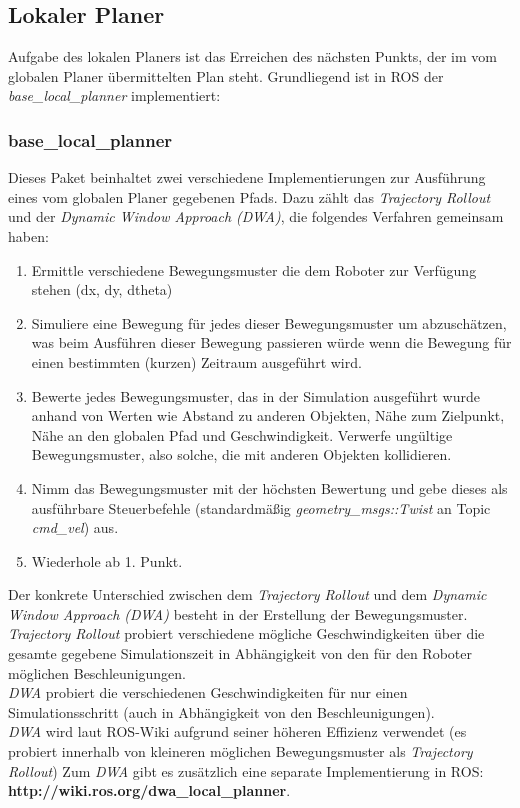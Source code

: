 \documentclass[oribibl]{llncs}
\begin{document}
\subsection{Lokaler Planer} \label{localPlanner}
Aufgabe des lokalen Planers ist das Erreichen des nächsten Punkts, der im vom globalen Planer übermittelten Plan steht. Grundliegend ist in ROS der \textit{base\_local\_planner} implementiert: \subsubsection{base\_local\_planner}
Dieses Paket beinhaltet zwei verschiedene Implementierungen zur Ausführung eines vom globalen Planer gegebenen Pfads. Dazu zählt das \textit{Trajectory Rollout} und der \textit{Dynamic Window Approach (DWA)}, die folgendes Verfahren gemeinsam haben:
\begin{enumerate}	
\item Ermittle verschiedene Bewegungsmuster die dem Roboter zur Verfügung stehen (dx, dy, dtheta)
\item Simuliere eine Bewegung für jedes dieser Bewegungsmuster um abzuschätzen, was beim Ausführen dieser Bewegung passieren würde wenn die Bewegung für einen bestimmten (kurzen) Zeitraum ausgeführt wird.
\item Bewerte jedes Bewegungsmuster, das in der Simulation ausgeführt wurde anhand von Werten wie Abstand zu anderen Objekten, Nähe zum Zielpunkt, Nähe an den globalen Pfad und Geschwindigkeit. Verwerfe ungültige Bewegungsmuster, also solche, die mit anderen Objekten kollidieren.
\item Nimm das Bewegungsmuster mit der höchsten Bewertung und gebe dieses als ausführbare Steuerbefehle (standardmäßig \textit{geometry\_msgs::Twist} an Topic \textit{cmd\_vel}) aus.
\item Wiederhole ab 1. Punkt.
\end{enumerate}

Der konkrete Unterschied zwischen dem \textit{Trajectory Rollout} und dem \textit{Dynamic Window Approach (DWA)} besteht in der Erstellung der Bewegungsmuster.\\
\textit{Trajectory Rollout} probiert verschiedene mögliche Geschwindigkeiten über die gesamte gegebene Simulationszeit in Abhängigkeit von den für den Roboter möglichen Beschleunigungen.\\
\textit{DWA} probiert die verschiedenen Geschwindigkeiten für nur einen Simulationsschritt (auch in Abhängigkeit von den Beschleunigungen).\\
\textit{DWA} wird laut ROS-Wiki aufgrund seiner höheren Effizienz verwendet (es probiert innerhalb von kleineren möglichen Bewegungsmuster als \textit{Trajectory Rollout}) \cite{baseLocalPlanner}
Zum \textit{DWA} gibt es zusätzlich eine separate Implementierung in ROS:\\ \textbf{http://wiki.ros.org/dwa\_local\_planner}.
\end{document}
